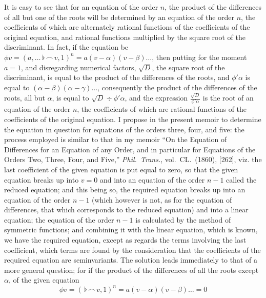 \documentclass[11pt,a4paper]{article}
\theoremstyle{definition}
\begin{document}
It is easy to see that for an equation of the order $n$, the product of the differences of all but one of the roots will be determined by an equation of the order $n$, the coefficients of which are alternately rational functions of the coefficients of the original equation, and rational functions multiplied by the square root of the discriminant. In fact, if the equation be $\phi v=(a,\ldots\,\flat\,\frown\, v,1)^n=a(v-\alpha)(v-\beta)\ldots$, then putting for the moment $a=1$, and disregarding numerical factors, $\sqrt{D}$, the square root of the discriminant, is equal to the product of the differences of the roots, and $\phi'\alpha$ is equal to $(\alpha-\beta)(\alpha-\gamma)\ldots$, consequently the product of the differences of the roots, all but $\alpha$, is equal to $\sqrt{D}\div\phi'\alpha$, and the expression $\frac{\sqrt{D}}{\phi'\alpha}$ is the root of an equation of the order $n$, the coefficients of which are rational functions of the coefficients of the original equation. I propose in the present memoir to determine the equation in question for equations of the orders three, four, and five: the process employed is similar to that in my memoir ``On the Equation of Differences for an Equation of any Order, and in particular for Equations of the Orders Two, Three, Four, and Five,'' \textit{Phil.\ Trans.}, vol.~CL.\ (1860), [262], viz. the last coefficient of the given equation is put equal to zero, so that the given equation breaks up into $v=0$ and into an equation of the order $n-1$ called the reduced equation; and this being so, the required equation breaks up into an equation of the order $n-1$ (which however is not, as for the equation of differences, that which corresponds to the reduced equation) and into a linear equation; the equation of the order $n-1$ is calculated by the method of symmetric functions; and combining it with the linear equation, which is known, we have the required equation, except as regards the terms involving the last coefficient, which terms are found by the consideration that the coefficients of the required equation are seminvariants. The solution leads immediately to that of a more general question; for if the product of the differences of all the roots except $\alpha$, of the given equation
\[
\phi v=(\,\flat\,\frown\, v,1)^n=a(v-\alpha)(v-\beta)\ldots=0
\]
\end{document}
